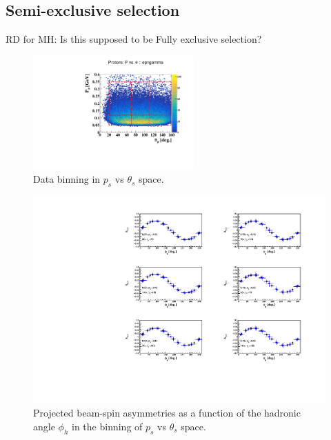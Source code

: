 \subsection{Semi-exclusive selection}
RD for MH: Is this supposed to be Fully exclusive selection?

\begin{figure}[htb]
  \centering
\includegraphics[width=0.55\textwidth,clip,trim=0mm 0mm 0mm 
   20mm]{figs_epngamma/pdf/epngamma_p_p_theta.pdf}
  \caption{Data binning in $p_s$ vs $\theta_s$ space.
   \label{fig:binning_x_t}}
\end{figure}

\begin{figure}[htb]
  \centering
    \includegraphics[width=1.1\textwidth,clip]{figs_epngamma/pdf/epngamma_BSA_incoherent_Phi.pdf}
  \caption{Projected beam-spin asymmetries as a function of the hadronic angle 
   $\phi_h$ in the binning of $p_s$ vs $\theta_s$ space.
   \label{fig:alu_semi}}
\end{figure}



